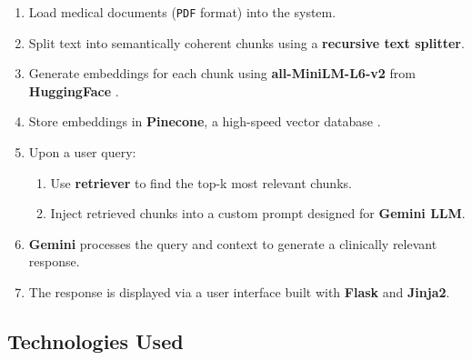 \documentclass[12pt,a4paper]{report}
\begin{document}
\begin{enumerate}
    \item Load medical documents (\texttt{PDF} format) into the system.
    \item Split text into semantically coherent chunks using a \textbf{recursive text splitter}.
    \item Generate embeddings for each chunk using \textbf{all-MiniLM-L6-v2} from \textbf{HuggingFace} \cite{sentence_transformers}.
    \item Store embeddings in \textbf{Pinecone}, a high-speed vector database \cite{pinecone}.
    \item Upon a user query:
    \begin{enumerate}
        \item Use \textbf{retriever} to find the top-k most relevant chunks.
        \item Inject retrieved chunks into a custom prompt designed for \textbf{Gemini LLM}.
    \end{enumerate}
    \item \textbf{Gemini} processes the query and context to generate a clinically relevant response.
    \item The response is displayed via a user interface built with \textbf{Flask} and \textbf{Jinja2}.
\end{enumerate}




\label{Technologies Used}
\subsection{Technologies Used}
\end{document}
